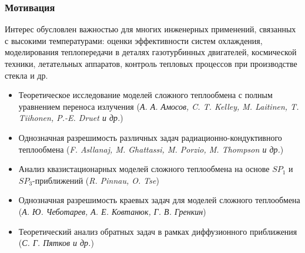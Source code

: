 \begin{frame}
    \setcounter{framenumber}{1}
    \maketitle
\end{frame}


\begin{frame}
    \frametitle{Мотивация}
    Интерес обусловлен важностью для многих
    инженерных применений, связанных с высокими температурами: оценки
    эффективности систем охлаждения, моделирования теплопередачи в деталях
    газотурбинных двигателей, космической техники, летательных аппаратов,
    контроль тепловых процессов при производстве стекла и др.

    \hfill
    \hfill
    \begin{itemize}
        \item Теоретическое исследование моделей сложного теплообмена с
        полным уравнением переноса излучения
        (\textit{А. А. Амосов, C. T. Kelley, M. Laitinen, T. Tiihonen, P.-E. Druet и др.})
        \item Однозначная разрешимость различных задач радиационно-кондуктивного теплообмена
        (\textit{F. Asllanaj, M. Ghattassi, M. Porzio, M. Thompson и др.})
        \item Анализ квазистационарных моделей сложного теплообмена на основе $SP_1$ и $SP_3$-приближений
        (\textit{R. Pinnau, O. Tse})
        \item Однозначная разрешимость краевых задач для моделей сложного теплообмена
        (\textit{А. Ю. Чеботарев, А. Е. Ковтанюк, Г. В. Гренкин})
        \item Теоретический анализ обратных задач в рамках диффузионного приближения
        (\textit{С. Г. Пятков и др.})
    \end{itemize}
\end{frame}
